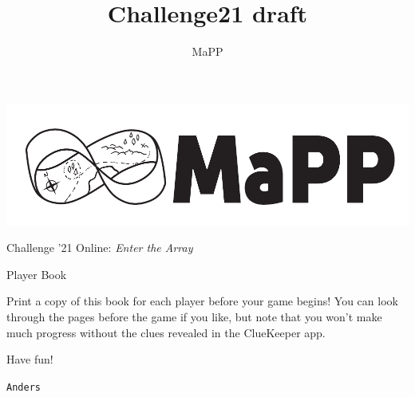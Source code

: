 \documentclass{article}
\title{Challenge21 draft}
\author{MaPP}
\newcommand{\puzzleTitle}[1]{
\begin{center}
{\Large \texttt{#1}}
\end{center}
}
\begin{document}

\thispagestyle{empty}
\begin{center}
\includegraphics[width=0.8\linewidth]{banner_bw}

\Large Challenge '21 Online: \textit{Enter the Array}

Player Book
\end{center}

\vspace{1in}

\noindent
Print a copy of this book for each
player before your game begins!
You can look through the pages before the game
if you like, but note that you
won't make much progress without the clues revealed
in the ClueKeeper app.

\vspace{1em}

\noindent
Have fun!


\newpage

\puzzleTitle{Anders}

\vfill
\end{document}
